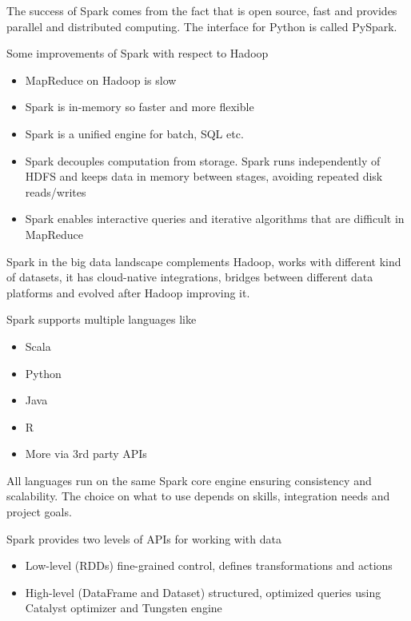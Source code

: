 The success of Spark comes from the fact that is open source, fast and provides parallel and distributed computing. The interface for Python is called PySpark.

Some improvements of Spark with respect to Hadoop
\begin{itemize}
    \item MapReduce on Hadoop is slow
    \item Spark is in-memory so faster and more flexible
    \item Spark is a unified engine for batch, SQL etc.
    \item Spark decouples computation from storage. Spark runs independently of HDFS and keeps data in memory between stages, avoiding repeated disk reads/writes
    \item Spark enables interactive queries and iterative algorithms that are difficult in MapReduce
\end{itemize}

Spark in the big data landscape complements Hadoop, works with different kind of datasets, it has cloud-native integrations, bridges between different data platforms and evolved after Hadoop improving it.

\vspace{10pt}

Spark supports multiple languages like

\begin{itemize}
    \item Scala
    \item Python
    \item Java
    \item R
    \item More via 3rd party APIs
\end{itemize}

All languages run on the same Spark core engine ensuring consistency and scalability. The choice on what to use depends on skills, integration needs and project goals. 

\vspace{10pt}

Spark provides two levels of APIs for working with data

\begin{itemize}
    \item Low-level (RDDs) \ra fine-grained control, defines transformations and actions
    \item High-level (DataFrame and Dataset) \ra structured, optimized queries using Catalyst optimizer and Tungsten engine
\end{itemize}

